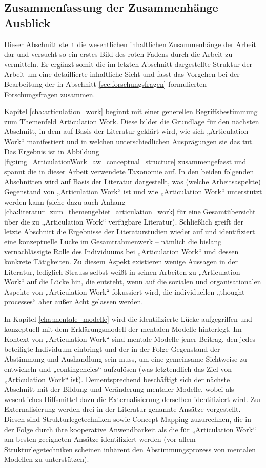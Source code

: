 \subsection{Zusammenfassung der Zusammenhänge -- Ausblick} %
\label{sub:zusammenhänge}

Dieser Abschnitt stellt die wesentlichen inhaltlichen Zusammenhänge der Arbeit dar und versucht so ein erstes Bild des roten Fadens durch die Arbeit zu vermitteln. Er ergänzt somit die im letzten Abschnitt dargestellte Struktur der Arbeit um eine detaillierte inhaltliche Sicht und fasst das Vorgehen bei der Bearbeitung der in Abschnitt \ref{sec:forschungsfragen} formulierten Forschungsfragen zusammen.

Kapitel \ref{cha:articulation_work} beginnt mit einer generellen Begriffsbestimmung zum Themenfeld Articulation Work. Diese bildet die Grundlage für den nächsten Abschnitt, in dem auf Basis der Literatur geklärt wird, wie sich „Articulation Work“ manifestiert und in welchen unterschiedlichen Ausprägungen sie das tut. Das Ergebnis ist in Abbildung \ref{fig:img_ArticulationWork_aw_conceptual_structure} zusammengefasst und spannt die in dieser Arbeit verwendete Taxonomie auf. In den beiden folgenden Abschnitten wird auf Basis der Literatur dargestellt, was (welche Arbeitsaspekte) Gegenstand von „Articulation Work“ ist und wie „Articulation Work“ unterstützt werden kann (siehe dazu auch Anhang \ref{cha:literatur_zum_themengebiet_articulation_work} für eine Gesamtübersicht über die zu „Articulation Work“ verfügbare Literatur). Schließlich greift der letzte Abschnitt die Ergebnisse der Literaturstudien wieder auf und identifiziert eine konzeptuelle Lücke im Gesamtrahmenwerk -- nämlich die bislang vernachlässigte Rolle des Individuums bei „Articulation Work“ und dessen konkrete Tätigkeiten. Zu diesem Aspekt existieren wenige Aussagen in der Literatur, lediglich Strauss selbst weißt in seinen Arbeiten zu „Articulation Work“ auf die Lücke hin, die entsteht, wenn auf die sozialen und organisationalen Aspekte von „Articulation Work“ fokussiert wird, die individuellen „thought processes“ aber außer Acht gelassen werden.

In Kapitel \ref{cha:mentale_modelle} wird die identifizierte Lücke aufgegriffen und konzeptuell mit dem Erklärungsmodell der mentalen Modelle hinterlegt. Im Kontext von „Articulation Work“ sind mentale Modelle jener Beitrag, den jedes beteiligte Individuum einbringt und der in der Folge Gegenstand der Abstimmung und Aushandlung sein muss, um eine gemeinsame Sichtweise zu entwickeln und „contingencies“ aufzulösen (was letztendlich das Ziel von „Articulation Work“ ist). Dementsprechend beschäftigt sich der nächste Abschnitt mit der Bildung und Veränderung mentaler Modelle, wobei als wesentliches Hilfsmittel dazu die Externalisierung derselben identifiziert wird. Zur Externalisierung werden drei in der Literatur genannte Ansätze vorgestellt. Diesen sind Strukturlegetechniken sowie Concept Mapping zuzurechnen, die in der Folge durch ihre kooperative Anwendbarkeit als die für „Articulation Work“ am besten geeigneten Ansätze identifiziert werden (vor allem Strukturlegetechniken scheinen inhärent den Abstimmungsprozess von mentalen Modellen zu unterstützen).


